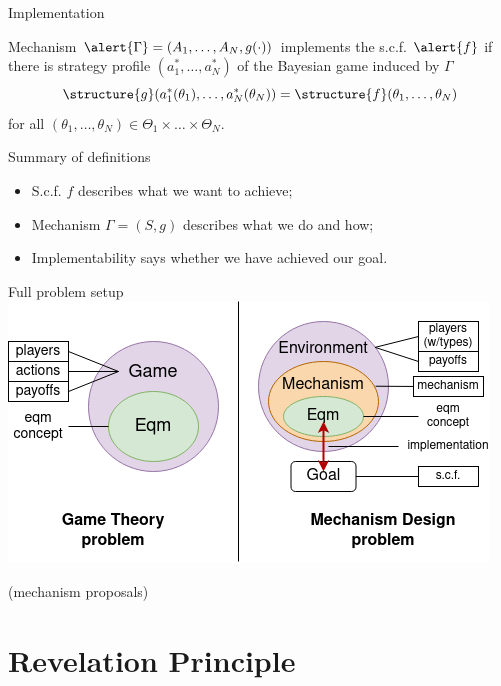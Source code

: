 \documentclass[english,10pt
,aspectratio=169
]{beamer}
\begin{document}
\begin{frame}{Implementation}
	\begin{definition}[implementation]
		Mechanism $\alert{\Gamma}=(A_{1},\dots,A_{N},g(\cdot))$ \alert{implements} the s.c.f. $\alert{f}$ if there is  strategy profile $(a_{1}^{*},\dots,a_{N}^{*})$ of the Bayesian game induced by $\Gamma$  
		$$\structure{g}(a_{1}^{*}(\theta_{1}),\dots,a_{N}^{*}(\theta_{N})) = \structure{f} (\theta_{1},\dots,\theta_{N})$$ 
		for all $(\theta_{1},\dots,\theta_{N})\in\Theta_{1}\times\dots \times\Theta_{N}$.
	\end{definition}
\end{frame}


\begin{frame}{Summary of definitions}
	\begin{itemize}
		\item S.c.f. $f$ describes what we want to achieve;
		\item Mechanism $\Gamma = (S,g)$ describes what we do and how;
		\item Implementability says whether we have achieved our goal.
	\end{itemize}
\end{frame}


\begin{frame}{Full problem setup}
	\centering
	\includegraphics[scale=0.7]{pics/L2/game_vs_mech2}
\end{frame}


\begin{frame}
	(mechanism proposals)
\end{frame}



\section{Revelation Principle}
\end{document}
